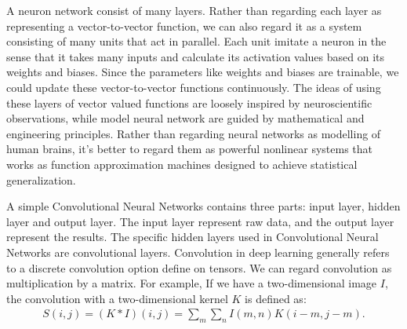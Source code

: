A neuron network consist of many layers. Rather than regarding each layer as representing a vector-to-vector function, we can also regard it as a system consisting of many units that act in parallel. Each unit imitate a neuron in the sense that it takes many inputs and calculate its activation values based on its weights and biases. Since the parameters like weights and biases are trainable, we could update these vector-to-vector functions continuously. The ideas of using these layers of vector valued functions are loosely inspired by neuroscientific observations, while model neural network are guided by mathematical and engineering principles. Rather than regarding neural networks as modelling of human brains, it’s better to regard them as powerful nonlinear systems that works as function approximation machines designed to achieve statistical generalization.

A simple Convolutional Neural Networks contains three parts: input layer, hidden layer and output layer. The input layer represent raw data, and the output layer represent the results. The specific hidden layers used in Convolutional Neural Networks are convolutional layers. Convolution in deep learning generally refers to a discrete convolution option define on tensors. We can regard convolution as multiplication by a matrix. For example, If we have a two-dimensional image $I$, the convolution with a two-dimensional kernel $K$ is defined as:
\begin{equation}
\begin{aligned}
S(i,j) = (K * I)(i,j) = \sum_m\sum_n I(m,n)K(i-m,j-m).
\end{aligned}
\end{equation}

